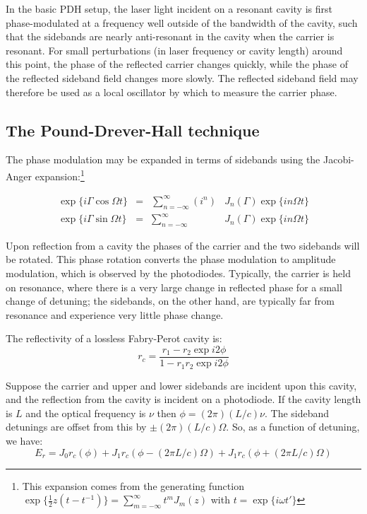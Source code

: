 In the basic PDH setup, the laser light incident on a resonant cavity
is first phase-modulated at a frequency well outside of the bandwidth
of the cavity, such that the sidebands are nearly anti-resonant in the
cavity when the carrier is resonant.  For small perturbations (in
laser frequency or cavity length) around this point, the phase of the
reflected carrier changes quickly, while the phase of the reflected
sideband field changes more slowly.  The reflected sideband field may
therefore be used as a local oscillator by which to measure the
carrier phase.

\subsection{The Pound-Drever-Hall technique}

The phase modulation may be expanded in terms of sidebands using the
Jacobi-Anger expansion:\footnote{This expansion comes from the 
generating function 
$\exp\{\frac{1}{2} z \left(t - t^{-1}\right)\} = \sum_{m=-\infty}^\infty t^m J_m(z)$ with $t = \exp \{i \omega t'\}$}

\begin{equation}
\begin{array}{rcll}
\exp\{i\Gamma\cos\Omega t\} & = &\sum_{n=-\infty}^{\infty} \left(i^n\right) & J_n(\Gamma) \exp\{i n \Omega t\} \\
\exp\{i\Gamma\sin\Omega t\} & = & \sum_{n=-\infty}^{\infty} & J_n(\Gamma) \exp\{i n \Omega t\}
\end{array}
\end{equation}

Upon reflection from a cavity the phases of the carrier and the two
sidebands will be rotated.  This phase rotation converts the phase
modulation to amplitude modulation, which is observed by the
photodiodes.  Typically, the carrier is held on resonance, where there
is a very large change in reflected phase for a small change of
detuning; the sidebands, on the other hand, are typically far from
resonance and experience very little phase change.

The reflectivity of a lossless Fabry-Perot cavity is:
\begin{equation}
r_c = \frac{r_1 - r_2 \exp i2\phi}{1 - r_1 r_2 \exp i 2\phi}
\end{equation}

Suppose the carrier and upper and lower sidebands are incident upon this
cavity, and the reflection from the cavity is incident on a photodiode.
If the cavity length is $L$ and the optical frequency is $\nu$ then
$\phi = (2\pi)(L/c)\nu$.  The sideband detunings are offset from this by
$\pm(2\pi)(L/c)\Omega$.  So, as a function of detuning, we have:
%
\begin{equation}
E_r = J_0 r_c(\phi) 
+ J_1 r_c(\phi - (2\pi L/c)\Omega) 
+ J_1 r_c(\phi + (2\pi L/c)\Omega)
\end{equation}

